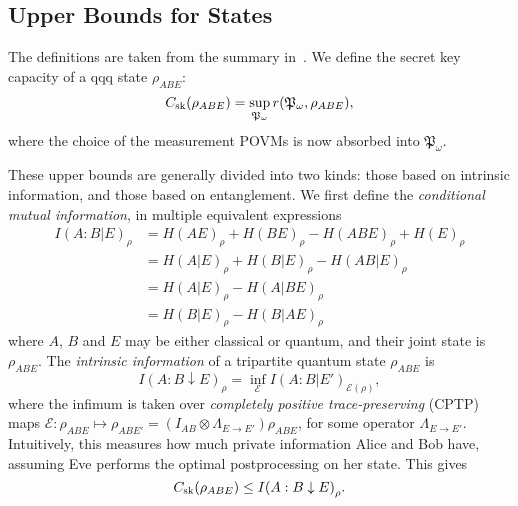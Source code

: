 \documentclass[10pt, a4paper]{article}
\numberwithin{equation}{section} %
\theoremstyle{definition}
\theoremstyle{plain}
\newcommand{\?}{\mathrel{?}} %
\newcommand{\cE}{\mathcal{E}}
\newcommand{\sk}{\rm sk}
\begin{document}
      \subsection{Upper Bounds for States}

      The definitions are taken from the summary in~\cite{CQKeyDistill}. We define the secret key capacity of a qqq state \(\rho_{ABE}\):
      \begin{equation}
      C_{\sk}(\rho_{A B E}) = \sup_{\mathfrak{P}_{\omega}} 
      r(\mathfrak{P}_{\omega}, \rho_{ABE}),
      \end{equation}
      where the choice of the measurement POVMs is now absorbed into \(\mathfrak{P}_{\omega}\).

      These upper bounds are generally divided into two kinds: those based on intrinsic information, and those based on entanglement. We first define the \emph{conditional mutual information}, in multiple equivalent expressions
      \begin{align}
        I{(A:B|E)}_{\rho} &= H{(AE)}_{\rho} + H{(BE)}_{\rho} - H{(ABE)}_{\rho} + H{(E)}_{\rho} \\
                          &= H{(A|E)}_{\rho} + H{(B|E)}_{\rho} - H{(AB|E)}_{\rho} \\
                          &= H{(A|E)}_{\rho} - H{(A|BE)}_{\rho} \\
                          &= H{(B|E)}_{\rho} - H{(B|AE)}_{\rho}
      \end{align}
      where \(A\), \(B\) and \(E\) may be either classical or quantum, and their joint state is \(\rho_{ABE}\). The \emph{intrinsic information} of a tripartite quantum state \(\rho_{A B E}\) is
      \begin{equation}
        I{(A : B \downarrow E)}_{\rho} = \inf_{\cE} I{(A : B|E')}_{\cE(\rho)},
      \end{equation}
      where the infimum is taken over \emph{completely positive trace-preserving} (CPTP) maps \(\cE : \rho_{A B E} \mapsto \rho_{A B E'} = \left(I_{A B} \otimes \Lambda_{E \to E'}\right) \rho_{A B E}\), for some operator \(\Lambda_{E \to E'}\). Intuitively, this measures how much private information Alice and Bob have, assuming Eve performs the optimal postprocessing on her state. This gives
      \begin{equation}
        C_{\sk}(\rho_{A B E}) \leq I{(A : B \downarrow E)}_{\rho}.
      \end{equation}
\end{document}
